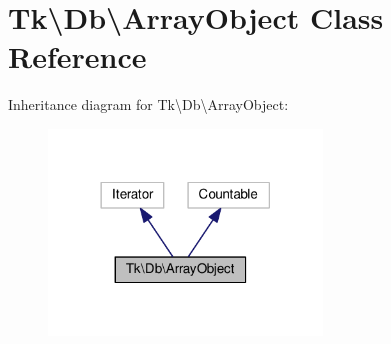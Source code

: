 \hypertarget{classTk_1_1Db_1_1ArrayObject}{\section{Tk\textbackslash{}Db\textbackslash{}Array\+Object Class Reference}
\label{classTk_1_1Db_1_1ArrayObject}
}


Inheritance diagram for Tk\textbackslash{}Db\textbackslash{}Array\+Object\+:\nopagebreak
\begin{figure}[H]
\begin{center}
\leavevmode
\includegraphics[width=206pt]{classTk_1_1Db_1_1ArrayObject__inherit__graph}
\end{center}
\end{figure}
